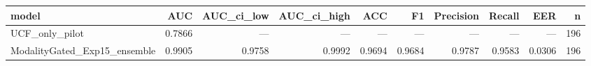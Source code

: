 \begin{tabular}{lrrrrrrrrr}
\toprule
model & AUC & AUC_ci_low & AUC_ci_high & ACC & F1 & Precision & Recall & EER & n \\
\midrule
UCF_only_pilot & 0.7866 & — & — & — & — & — & — & — & 196 \\
ModalityGated_Exp15_ensemble & 0.9905 & 0.9758 & 0.9992 & 0.9694 & 0.9684 & 0.9787 & 0.9583 & 0.0306 & 196 \\
\bottomrule
\end{tabular}
